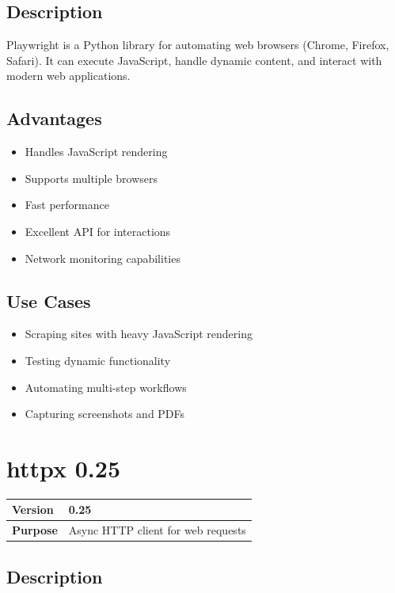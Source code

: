 \documentclass[12pt,a4paper]{report}
\begin{document}
\subsection{Description}

Playwright is a Python library for automating web browsers (Chrome, Firefox, Safari). It can execute JavaScript, handle dynamic content, and interact with modern web applications.

\subsection{Advantages}

\begin{itemize}
    \item Handles JavaScript rendering
    \item Supports multiple browsers
    \item Fast performance
    \item Excellent API for interactions
    \item Network monitoring capabilities
\end{itemize}

\subsection{Use Cases}

\begin{itemize}
    \item Scraping sites with heavy JavaScript rendering
    \item Testing dynamic functionality
    \item Automating multi-step workflows
    \item Capturing screenshots and PDFs
\end{itemize}

\section{httpx 0.25}

\begin{tabular}{|p{4cm}|p{10cm}|}
\hline
\textbf{Version} & 0.25 \\
\hline
\textbf{Purpose} & Async HTTP client for web requests \\
\hline
\end{tabular}

\subsection{Description}
\end{document}
